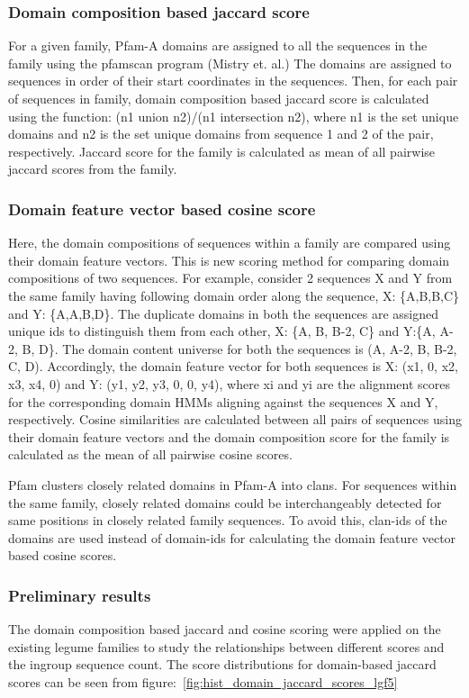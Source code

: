\documentclass{article}
\begin{document}
		\subsubsection{Domain composition based jaccard score}
		For a given family, Pfam-A domains are assigned to all the sequences in the family using the pfamscan program (Mistry et. al.) The domains are assigned  to sequences in order of their start coordinates in the sequences. Then, for each pair of sequences in family, domain composition based jaccard score is calculated using the function: (n1 union n2)/(n1 intersection n2), where n1 is the set unique domains and n2 is the set unique domains from sequence 1 and 2 of the pair, respectively. Jaccard score for the family is calculated as mean of all pairwise jaccard scores from the family.
		
		\subsubsection{Domain feature vector based cosine score}
		Here, the domain compositions of sequences within a family are compared using their domain feature vectors. This is new scoring method for comparing domain compositions of two sequences. For example, consider 2 sequences X and Y from the same family having following domain order along the sequence, X: \{A,B,B,C\} and Y: \{A,A,B,D\}. The duplicate domains in both the sequences are assigned unique ids to distinguish them from each other, X: \{A, B, B-2, C\} and Y:\{A, A-2, B, D\}. The domain content universe for both the sequences is (A, A-2, B, B-2, C, D). Accordingly, the domain feature vector for both sequences is X: (x1, 0, x2, x3, x4, 0) and Y: (y1, y2, y3, 0, 0, y4), where xi and yi are the alignment scores for the corresponding domain HMMs aligning against the sequences X and Y, respectively. Cosine similarities are calculated between all pairs of sequences using their domain feature vectors and the domain composition score for the family is calculated as the mean of all pairwise cosine scores.
		
		Pfam clusters closely related domains in Pfam-A into clans. For sequences within the same family, closely related domains could be interchangeably detected for same positions in closely related family sequences. To avoid this, clan-ids of the domains are used instead of domain-ids for calculating the domain feature vector based cosine scores.
		
		\subsubsection{Preliminary results}
		The domain composition based jaccard and cosine scoring were applied on the existing legume families to study the relationships between different scores and the ingroup sequence count. The score distributions for domain-based jaccard scores can be seen from figure:~\ref{fig:hist_domain_jaccard_scores_lgf5}
		
\end{document}
